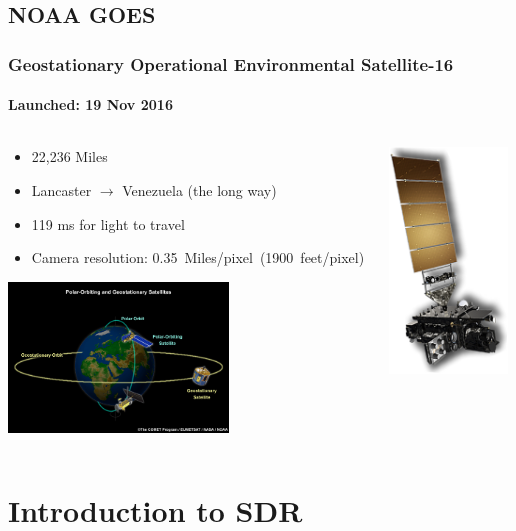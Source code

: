 \documentclass[]{beamer}
\begin{document}
\subsection{NOAA GOES}
\begin{frame}
    \frametitle{Geostationary Operational Environmental Satellite-16}
    \framesubtitle{Launched: 19 Nov 2016}
    \begin{columns}[T]
        \begin{column}[T]{6.1cm}
            \begin{itemize}
                \item 22,236 Miles
                \item Lancaster $\to$ Venezuela (the long way)
                \item 119 ms for light to travel
                \item Camera resolution: 0.35~Miles/pixel~(1900~feet/pixel)
            \end{itemize}
            \includegraphics[height=4cm,keepaspectratio]{images/polar-vs-geo-satellites.jpg}
        \end{column}
        \begin{column}[T]{4cm}
            \includegraphics[height=6cm,keepaspectratio]{images/goes-r-illus.png}
        \end{column}
    \end{columns}
\end{frame}


\section{Introduction to SDR}
\end{document}
